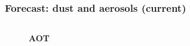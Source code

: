 \documentclass[aspectratio=169, 10pt]{beamer}
\begin{document}
\begin{frame}
\frametitle{Forecast: dust and aerosols (current)}

\begin{columns}
\begin{column}{0.33\textwidth}


\vspace{-3.5cm}
\begin{figure}
\textbf{AOT} \vspace{0.0cm}\\
\end{figure}


\end{column}
\end{columns}
\end{frame}
\end{document}
